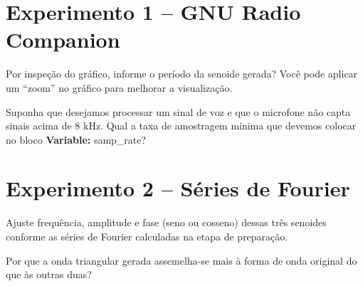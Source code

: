 \documentclass[12pt,addpoints]{exam}
\begin{document}
\section*{Experimento 1 -- GNU Radio Companion}

\begin{questions}
    \question Por inspeção do gráfico, informe o período da senoide gerada? Você pode aplicar um ``zoom'' no gráfico para melhorar a visualização.
    \fillwithlines{0.25in}

    \question Suponha que desejamos processar um sinal de voz e que o microfone não capta sinais acima de 8 kHz. Qual a taxa de amostragem mínima que devemos colocar no bloco \textbf{Variable:} samp\_rate?
    \fillwithlines{0.25in}
\end{questions}

\section*{Experimento 2 -- Séries de Fourier}

\begin{questions}
    \question Ajuste frequência, amplitude e fase (seno ou cosseno) dessas três senoides conforme as séries de Fourier calculadas na etapa de preparação.

    \question Por que a onda triangular gerada assemelha-se mais à forma de onda original do que às outras duas?
    \fillwithlines{0.5in}

\end{questions}
\end{document}
